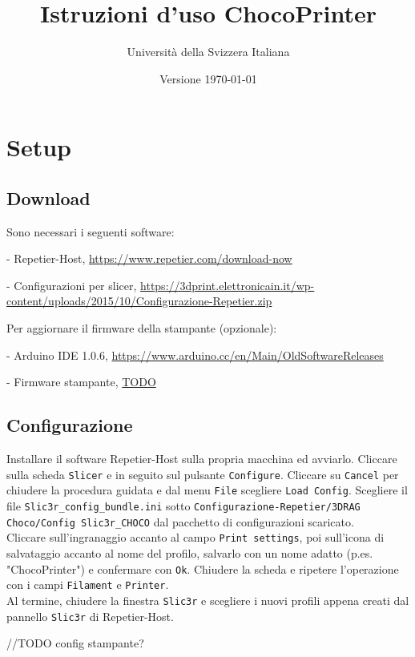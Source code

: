\documentclass[12pt]{article}
\title{Istruzioni d'uso ChocoPrinter}
\author{Università della Svizzera Italiana}
\date{Versione \today}
\begin{document}
\maketitle
\tableofcontents
\newpage

\section{Setup}

	\subsection{Download}\label{sec:download}

		Sono necessari i seguenti software:

		- Repetier-Host, \url{https://www.repetier.com/download-now}

		- Configurazioni per slicer, \url{https://3dprint.elettronicain.it/wp-content/uploads/2015/10/Configurazione-Repetier.zip}

		Per aggiornare il firmware della stampante (opzionale):

		- Arduino IDE 1.0.6, \url{https://www.arduino.cc/en/Main/OldSoftwareReleases}

		- Firmware stampante, \url{TODO}
		
		
	\subsection{Configurazione}
	
		Installare il software Repetier-Host sulla propria macchina ed avviarlo. Cliccare sulla scheda \texttt{Slicer} e in seguito sul pulsante \texttt{Configure}. Cliccare su \texttt{Cancel} per chiudere la procedura guidata e dal menu \texttt{File} scegliere \texttt{Load Config}. Scegliere il file \texttt{Slic3r\_config\_bundle.ini} sotto \texttt{Configurazione-Repetier/3DRAG Choco/Config Slic3r\_CHOCO} dal pacchetto di configurazioni scaricato.\\
		Cliccare sull'ingranaggio accanto al campo \texttt{Print settings}, poi sull'icona di salvataggio accanto al nome del profilo, salvarlo con un nome adatto (p.es. "ChocoPrinter") e confermare con \texttt{Ok}. Chiudere la scheda e ripetere l'operazione con i campi \texttt{Filament} e \texttt{Printer}.\\
		Al termine, chiudere la finestra \texttt{Slic3r} e scegliere i nuovi profili appena creati dal pannello \texttt{Slic3r} di Repetier-Host.
		
		//TODO config stampante?
\end{document}
